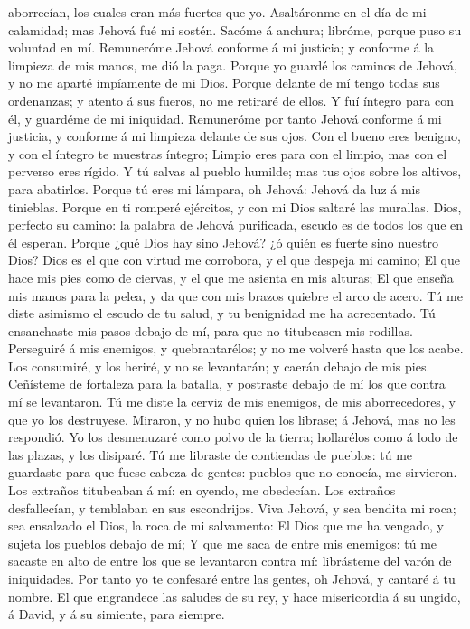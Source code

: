 aborrecían, los cuales eran más fuertes que yo. 
Asaltáronme en el día de mi calamidad; mas Jehová fué mi sostén.
 Sacóme á anchura; libróme, porque puso su voluntad en
mí.  Remuneróme Jehová conforme á mi justicia; y conforme
á la limpieza de mis manos, me dió la paga.  Porque yo
guardé los caminos de Jehová, y no me aparté impíamente de mi Dios.
 Porque delante de mí tengo todas sus ordenanzas; y
atento á sus fueros, no me retiraré de ellos.  Y fuí
íntegro para con él, y guardéme de mi iniquidad. 
Remuneróme por tanto Jehová conforme á mi justicia, y conforme á mi
limpieza delante de sus ojos.  Con el bueno eres benigno,
y con el íntegro te muestras íntegro;  Limpio eres para
con el limpio, mas con el perverso eres rígido.  Y tú
salvas al pueblo humilde; mas tus ojos sobre los altivos, para
abatirlos.  Porque tú eres mi lámpara, oh Jehová: Jehová
da luz á mis tinieblas.  Porque en ti romperé ejércitos,
y con mi Dios saltaré las murallas.  Dios, perfecto su
camino: la palabra de Jehová purificada, escudo es de todos los que en
él esperan.  Porque ¿qué Dios hay sino Jehová? ¿ó quién
es fuerte sino nuestro Dios?  Dios es el que con virtud
me corrobora, y el que despeja mi camino;  El que hace
mis pies como de ciervas, y el que me asienta en mis alturas;
 El que enseña mis manos para la pelea, y da que con mis
brazos quiebre el arco de acero.  Tú me diste asimismo el
escudo de tu salud, y tu benignidad me ha acrecentado. 
Tú ensanchaste mis pasos debajo de mí, para que no titubeasen mis
rodillas.  Perseguiré á mis enemigos, y quebrantarélos; y
no me volveré hasta que los acabe.  Los consumiré, y los
heriré, y no se levantarán; y caerán debajo de mis pies. 
Ceñísteme de fortaleza para la batalla, y postraste debajo de mí los que
contra mí se levantaron.  Tú me diste la cerviz de mis
enemigos, de mis aborrecedores, y que yo los destruyese. 
Miraron, y no hubo quien los librase; á Jehová, mas no les respondió.
 Yo los desmenuzaré como polvo de la tierra; hollarélos
como á lodo de las plazas, y los disiparé.  Tú me
libraste de contiendas de pueblos: tú me guardaste para que fuese cabeza
de gentes: pueblos que no conocía, me sirvieron.  Los
extraños titubeaban á mí: en oyendo, me obedecían.  Los
extraños desfallecían, y temblaban en sus escondrijos. 
Viva Jehová, y sea bendita mi roca; sea ensalzado el Dios, la roca de mi
salvamento:  El Dios que me ha vengado, y sujeta los
pueblos debajo de mí;  Y que me saca de entre mis
enemigos: tú me sacaste en alto de entre los que se levantaron contra
mí: librásteme del varón de iniquidades.  Por tanto yo te
confesaré entre las gentes, oh Jehová, y cantaré á tu nombre.
 El que engrandece las saludes de su rey, y hace
misericordia á su ungido, á David, y á su simiente, para siempre.

